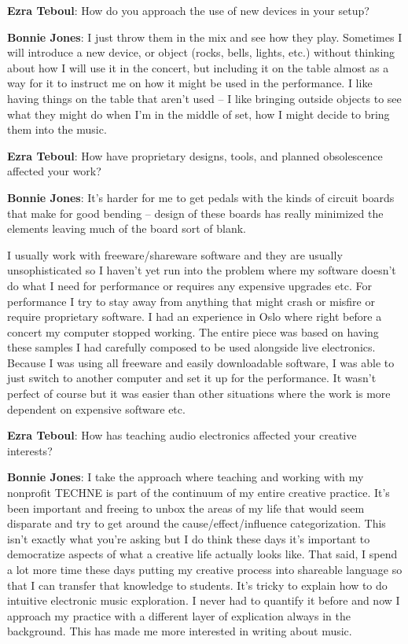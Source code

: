 \textbf{Ezra Teboul}: How do you approach the use of new devices in your setup? 

\textbf{Bonnie Jones}: I just throw them in the mix and see how they play. Sometimes I will introduce a new device, or object (rocks, bells, lights, etc.) without thinking about how I will use it in the concert, but including it on the table almost as a way for it to instruct me on how it might be used in the performance. I like having things on the table that aren’t used – I like bringing outside objects to see what they might do when I’m in the middle of set, how I might decide to bring them into the music.

\textbf{Ezra Teboul}: How have proprietary designs, tools, and planned obsolescence affected your work? 

\textbf{Bonnie Jones}: It’s harder for me to get pedals with the kinds of circuit boards that make for good bending – design of these boards has really minimized the elements leaving much of the board sort of blank. 

I usually work with freeware/shareware software and they are usually unsophisticated so I haven’t yet run into the problem where my software doesn’t do what I need for performance or requires any expensive upgrades etc. For performance I try to stay away from anything that might crash or misfire or require proprietary software. I had an experience in Oslo where right before a concert my computer stopped working. The entire piece was based on having these samples I had carefully composed to be used alongside live electronics. Because I was using all freeware and easily downloadable software, I was able to just switch to another computer and set it up for the performance. It wasn’t perfect of course but it was easier than other situations where the work is more dependent on expensive software etc. 

\textbf{Ezra Teboul}: How has teaching audio electronics affected your creative interests?

\textbf{Bonnie Jones}: I take the approach where teaching and working with my nonprofit TECHNE is part of the continuum of my entire creative practice. It’s been important and freeing to unbox the areas of my life that would seem disparate and try to get around the cause/effect/influence categorization. This isn’t exactly what you’re asking but I do think these days it’s important to democratize aspects of what a creative life actually looks like. That said, I spend a lot more time these days putting my creative process into shareable language so that I can transfer that knowledge to students. It’s tricky to explain how to do intuitive electronic music exploration. I never had to quantify it before and now I approach my practice with a different layer of explication always in the background. This has made me more interested in writing about music. 

